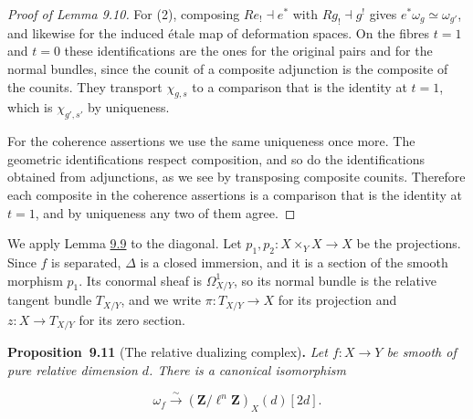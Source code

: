 \documentclass[11pt]{article}
\newenvironment{bpstatement}[2]{\par\addvspace{0.6\baselineskip}\noindent\textbf{#1}#2\textbf{.}\enspace\ignorespaces}
  {\par\addvspace{0.4\baselineskip}}
\newenvironment{bpstatementit}[2]{\begin{bpstatement}{#1}{#2}\itshape\ignorespaces}{\end{bpstatement}}
\begin{document}
\begin{proof}[{Proof of Lemma 9.10}]
For (2), composing \(Re_!\dashv e^*\) with \(Rg_!\dashv g^!\) gives \(e^*\omega_g\simeq\omega_{g'}\), and likewise for the induced étale map of deformation spaces. On the fibres \(t=1\) and \(t=0\) these identifications are the ones for the original pairs and for the normal bundles, since the counit of a composite adjunction is the composite of the counits. They transport \(\chi_{g,s}\) to a comparison that is the identity at \(t=1\), which is \(\chi_{g',s'}\) by uniqueness.

For the coherence assertions we use the same uniqueness once more. The geometric identifications respect composition, and so do the identifications obtained from adjunctions, as we see by transposing composite counits. Therefore each composite in the coherence assertions is a comparison that is the identity at \(t=1\), and by uniqueness any two of them agree.
\end{proof}

\label{bp35}%
We apply Lemma \hyperref[bp29]{9.9} to the diagonal. Let \(p_1,p_2:X\times_YX\to X\) be the projections. Since \(f\) is separated, \(\Delta\) is a closed immersion, and it is a section of the smooth morphism \(p_1\). Its conormal sheaf is \(\Omega^1_{X/Y}\), so its normal bundle is the relative tangent bundle \(T_{X/Y}\), and we write \(\pi:T_{X/Y}\to X\) for its projection and \(z:X\to T_{X/Y}\) for its zero section.

\label{bp36}%
\begin{bpstatementit}{Proposition~9.11}{ (The relative dualizing complex)}
Let \(f:X\to Y\) be smooth of pure relative dimension \(d\). There is a canonical isomorphism

\[
\omega_{f}\xrightarrow{\sim}(\mathbf Z/\ell^n\mathbf Z)_{X}(d)[2d].
\tag{9.14}
\]
\end{bpstatementit}
\end{document}
